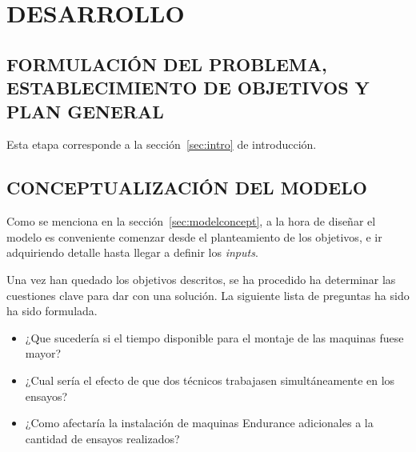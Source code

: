 
\section{DESARROLLO}

\subsection{FORMULACIÓN DEL PROBLEMA, \newline ESTABLECIMIENTO DE OBJETIVOS Y PLAN \newline GENERAL}

Esta etapa corresponde a la sección~\ref{sec:intro} de introducción.

\subsection{CONCEPTUALIZACIÓN DEL MODELO}

Como se menciona en la sección~\ref{sec:modelconcept}, a la hora de diseñar el modelo
es conveniente comenzar desde el planteamiento de los objetivos,
e ir adquiriendo detalle hasta llegar a definir los \textit{inputs}.

Una vez han quedado los objetivos descritos,
se ha procedido ha determinar las cuestiones clave para dar con una solución.
La siguiente lista de preguntas ha sido ha sido formulada.

\begin{itemize}
	\item ¿Que sucedería si el tiempo disponible para el montaje de las maquinas fuese mayor? 
	\item ¿Cual sería el efecto de que dos técnicos trabajasen simultáneamente en los ensayos?
	\item ¿Como afectaría la instalación de maquinas Endurance
		adicionales a la cantidad de ensayos realizados?
\end{itemize}


